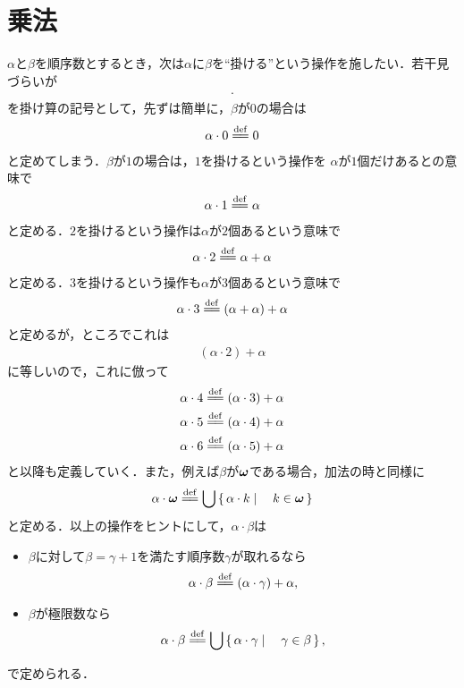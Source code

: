 \section{乗法}
	$\alpha$と$\beta$を順序数とするとき，次は$\alpha$に$\beta$を``掛ける''という操作を施したい．若干見づらいが
	\begin{align}
		\cdot
	\end{align}
	を掛け算の記号として，先ずは簡単に，$\beta$が$0$の場合は
	\begin{align}
		\alpha \cdot 0 \defeq 0
	\end{align}
	と定めてしまう．$\beta$が$1$の場合は，$1$を掛けるという操作を
	$\alpha$が$1$個だけあるとの意味で
	\begin{align}
		\alpha \cdot 1 \defeq \alpha
	\end{align}
	と定める．$2$を掛けるという操作は$\alpha$が$2$個あるという意味で
	\begin{align}
		\alpha \cdot 2 \defeq \alpha + \alpha
	\end{align}
	と定める．$3$を掛けるという操作も$\alpha$が$3$個あるという意味で
	\begin{align}
		\alpha \cdot 3 \defeq (\alpha + \alpha) + \alpha
	\end{align}
	と定めるが，ところでこれは
	\begin{align}
		(\alpha \cdot 2) + \alpha
	\end{align}
	に等しいので，これに倣って
	\begin{align}
		&\alpha \cdot 4 \defeq (\alpha \cdot 3) + \alpha \\
		&\alpha \cdot 5 \defeq (\alpha \cdot 4) + \alpha \\
		&\alpha \cdot 6 \defeq (\alpha \cdot 5) + \alpha
	\end{align}
	と以降も定義していく．また，例えば$\beta$が${\boldsymbol \omega}$である場合，加法の時と同様に
	\begin{align}
		\alpha \cdot \Natural \defeq \bigcup \Set{\alpha \cdot k}{k \in \Natural}
	\end{align}
	と定める．以上の操作をヒントにして，$\alpha \cdot \beta$は
	\begin{itemize}
		\item $\beta$に対して$\beta = \gamma + 1$を満たす順序数$\gamma$が取れるなら
			\begin{align}
				\alpha \cdot \beta \defeq (\alpha \cdot \gamma) + \alpha,
			\end{align}
		
		\item $\beta$が極限数なら
			\begin{align}
				\alpha \cdot \beta \defeq \bigcup \Set{\alpha \cdot \gamma}{\gamma \in \beta},
			\end{align}
	\end{itemize}
	で定められる．
	
